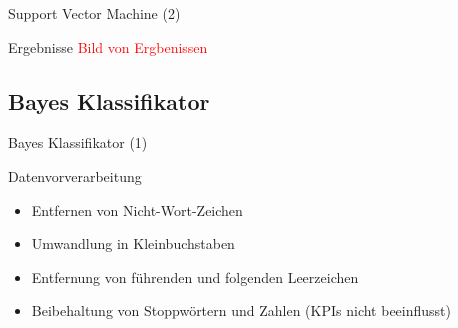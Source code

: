 \documentclass[aspectratio=169]{beamer} %
\begin{document}
\begin{frame}{Support Vector Machine (2)}
    \begin{block}{Ergebnisse}
        \textcolor{red}{Bild von Ergbenissen}
    \end{block}
\end{frame}

\subsection{Bayes Klassifikator}

\begin{frame}{Bayes Klassifikator (1)}
    \begin{block}{Datenvorverarbeitung}
        \begin{itemize}
            \item Entfernen von Nicht-Wort-Zeichen
            \item Umwandlung in Kleinbuchstaben
            \item Entfernung von f\"uhrenden und folgenden Leerzeichen
            \item Beibehaltung von Stoppw\"ortern und Zahlen (KPIs nicht beeinflusst)
        \end{itemize}
    \end{block}
\end{frame}
\end{document}
